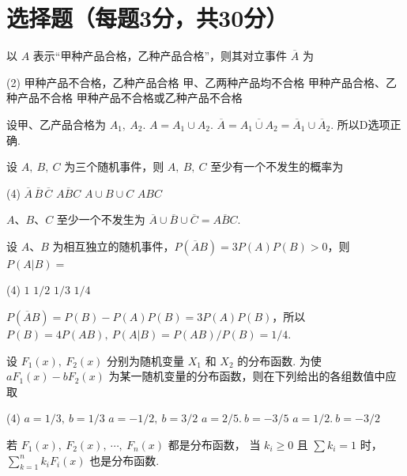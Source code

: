 \section{选择题（每题3分，共30分）}

\begin{problem}
  以 $A$ 表示``甲种产品合格，乙种产品合格''，则其对立事件 $\overline A$ 为
  \begin{tasks}(2)
    \task 甲种产品不合格，乙种产品合格
    \task 甲、乙两种产品均不合格
    \task 甲种产品合格、乙种产品不合格
    \task[\true] 甲种产品不合格或乙种产品不合格
  \end{tasks}
\end{problem}
\begin{solution}
  设甲、乙产品合格为 $A_1,~ A_2$. $A = A_1 \cup A_2$.
  $\overline A = \overline{A_1 \cup A_2} = \overline A_1 \cup \overline A_2$.
  所以D选项正确.
\end{solution}

\begin{problem}
  设 $A,~ B,~ C$ 为三个随机事件，则 $A,~ B,~ C$ 至少有一个不发生的概率为
  \begin{tasks}(4)
    \task $\overline A\, \overline B\, \overline C$
    \task[\true] $\overline{ABC}$
    \task $A \cup B \cup C$
    \task $ABC$
  \end{tasks}
\end{problem}
\begin{solution}
  $A$、$B$、$C$ 至少一个不发生为
  $\overline A \cup \overline B \cup \overline C = \overline{ABC}$.
\end{solution}

\begin{problem}
  设 $A$、$B$ 为相互独立的随机事件，$P(\overline AB) = 3P(A)P(B) > 0$，则 $P(A|B) = $
  \begin{tasks}(4)
    \task $1$
    \task $1/2$
    \task $1/3$
    \task[\true] $1/4$
  \end{tasks}
\end{problem}
\begin{solution}
  $P(\overline A B) = P(B) - P(A)P(B) = 3P(A)P(B)$，所以
  $P(B) = 4P(AB),~ P(A|B) = P(AB)/P(B) = 1/4$.
\end{solution}

\begin{problem}
  设 $F_1(x),~ F_2(x)$ 分别为随机变量 $X_1$ 和 $X_2$ 的分布函数.
  为使 $aF_1(x) - bF_2(x)$ 为某一随机变量的分布函数，则在下列给出的各组数值中应取
  \begin{tasks}(4)
    \task $a = 1/3,~ b = 1/3$
    \task $a = -1/2,~ b = 3/2$
    \task[\true] $a = 2/5.~ b = -3/5$
    \task $a = 1/2.~ b = -3/2$
  \end{tasks}
\end{problem}
\begin{solution}
若 $F_1(x),~ F_2(x),~ \cdots,~ F_n(x)$ 都是分布函数，
当 $k_i \geq 0$ 且 $\sum k_i = 1$ 时，$\sum_{k = 1}^n k_i F_i(x)$ 也是分布函数.
\end{solution}

